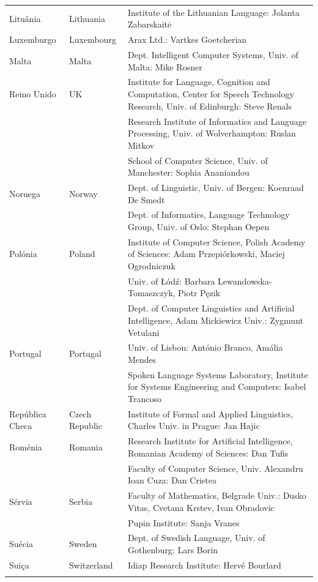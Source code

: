 \begin{longtable}{llp{105mm}}
  Lituânia & \textcolor{grey1}{Lithuania} & Institute of the Lithuanian Language: Jolanta Zabarskaitė \\ \addlinespace
  Luxemburgo & \textcolor{grey1}{Luxembourg} & Arax Ltd.: Vartkes Goetcherian \\ \addlinespace
  Malta & \textcolor{grey1}{Malta} & Dept. Intelligent Computer Systems, Univ. of Malta: Mike Rosner \\ \addlinespace Reino Unido & \textcolor{grey1}{UK} & Institute for Language, Cognition and Computation, Center for Speech Technology Research, Univ. of Edinburgh: Steve Renals \\ \addlinespace 
  & & Research Institute of Informatics and Language Processing, Univ. of Wolverhampton: Ruslan Mitkov \\ \addlinespace 
  & & School of Computer Science, Univ. of Manchester: Sophia Ananiandou \\ \addlinespace 
  Noruega & \textcolor{grey1}{Norway} & Dept. of Linguistic, Univ. of Bergen: Koenraad De Smedt \\ \addlinespace 
  & & Dept. of Informatics, Language Technology Group, Univ. of Oslo: Stephan Oepen \\ \addlinespace
  Polónia & \textcolor{grey1}{Poland} & Institute of Computer Science, Polish Academy of Sciences: Adam Przepiórkowski, Maciej Ogrodniczuk \\ \addlinespace
  & & Univ. of Łódź: Barbara Lewandowska-Tomaszczyk, Piotr Pęzik \\ \addlinespace
  & & Dept. of Computer Linguistics and Artificial Intelligence, Adam Mickiewicz Univ.: Zygmunt Vetulani \\ \addlinespace
  Portugal & \textcolor{grey1}{Portugal} & Univ. of Lisbon: António Branco, Amália Mendes \\ \addlinespace
  & & Spoken Language Systems Laboratory, Institute for Systems Engineering and Computers: Isabel Trancoso \\ \addlinespace
  República Checa & \textcolor{grey1}{Czech Republic} & Institute of Formal and Applied Linguistics, Charles Univ. in Prague: Jan Hajic \\ \addlinespace
  Roménia & \textcolor{grey1}{Romania} & Research Institute for Artificial Intelligence, Romanian Academy of Sciences: Dan Tufis \\ \addlinespace
  & & Faculty of Computer Science, Univ. Alexandru Ioan Cuza: Dan Cristea \\ \addlinespace
  Sérvia & \textcolor{grey1}{Serbia} & Faculty of Mathematics, Belgrade Univ.: Dusko Vitas, Cvetana Krstev, Ivan Obradovic \\ \addlinespace
  & & Pupin Institute: Sanja Vranes \\ \addlinespace  
  Suécia & \textcolor{grey1}{Sweden} & Dept. of Swedish Language, Univ. of Gothenburg: Lars Borin \\ \addlinespace 
  Suiça & \textcolor{grey1}{Switzerland} & Idiap Research Institute: Hervé Bourlard \\ \addlinespace 
\end{longtable}
\normalsize

